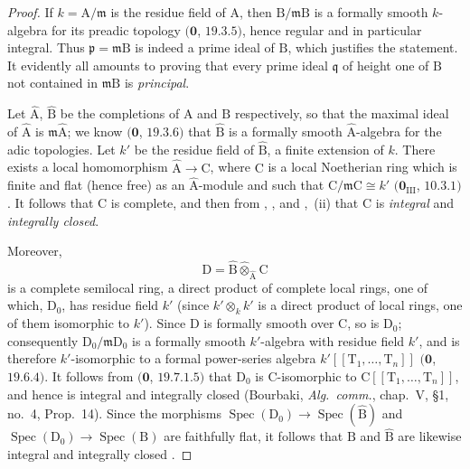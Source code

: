 \begin{proof}
If $k=\mathrm{A}/\mathfrak{m}$ is the residue field of $\mathrm{A}$, then $\mathrm{B}/\mathfrak{m}\mathrm{B}$ is a formally smooth $k$-algebra for its preadic topology $(\mathbf{0}$, $19.3.5)$, hence regular and in particular integral. Thus $\mathfrak{p}=\mathfrak{m}\mathrm{B}$ is indeed a prime ideal of $\mathrm{B}$, which justifies the statement.
It evidently all amounts to proving that every prime ideal $\mathfrak{q}$ of height one of $\mathrm{B}$ not contained in $\mathfrak{m}\mathrm{B}$ is \emph{principal}.

Let $\widehat{\mathrm{A}}$, $\widehat{\mathrm{B}}$ be the completions of $\mathrm{A}$ and $\mathrm{B}$ respectively, so that the maximal ideal of $\widehat{\mathrm{A}}$ is $\mathfrak{m}\widehat{\mathrm{A}}$; we know $(\mathbf{0}$, $19.3.6)$ that $\widehat{\mathrm{B}}$ is a formally smooth $\widehat{\mathrm{A}}$-algebra for the adic topologies.
Let $k'$ be the residue field of $\widehat{\mathrm{B}}$, a finite extension of $k$. There exists a local homomorphism $\widehat{\mathrm{A}}\to\mathrm{C}$, where $\mathrm{C}$ is a local Noetherian ring which is finite and flat (hence free) as an $\widehat{\mathrm{A}}$-module and such that $\mathrm{C}/\mathfrak{m}\mathrm{C}\cong k'$ $(\mathbf{0}_{\mathrm{III}}$, $10.3.1)$. It follows that $\mathrm{C}$ is complete, and then from , , and ,~(ii) that $\mathrm{C}$ is \emph{integral} and \emph{integrally closed}.

Moreover,
\[
  \mathrm{D}=\widehat{\mathrm{B}}\widehat{\otimes}_{\widehat{\mathrm{A}}}\mathrm{C}
\]
is a complete semilocal ring, a direct product of complete local rings, one of which, $\mathrm{D}_0$, has residue field $k'$ (since $k'\otimes_k k'$ is a direct product of local rings, one of them isomorphic to $k'$). Since $\mathrm{D}$ is formally smooth over $\mathrm{C}$, so is $\mathrm{D}_0$; consequently $\mathrm{D}_0/\mathfrak{m}\mathrm{D}_0$ is a formally smooth $k'$-algebra with residue field $k'$, and is therefore $k'$-isomorphic to a formal power-series algebra $k'[[\mathrm{T}_1,\ldots,\mathrm{T}_n]]$ $(\mathbf{0}$, $19.6.4)$. It follows from $(\mathbf{0}$, $19.7.1.5)$ that $\mathrm{D}_0$ is $\mathrm{C}$-isomorphic to $\mathrm{C}[[\mathrm{T}_1,\ldots,\mathrm{T}_n]]$, and hence is integral and integrally closed (Bourbaki, \emph{Alg.\ comm.}, chap.~V, \S1, no.~4, Prop.~14). Since the morphisms $\operatorname{Spec}(\mathrm{D}_0)\to\operatorname{Spec}(\widehat{\mathrm{B}})$ and $\operatorname{Spec}(\mathrm{D}_0)\to\operatorname{Spec}(\mathrm{B})$ are faithfully flat, it follows that $\mathrm{B}$ and $\widehat{\mathrm{B}}$ are likewise integral and integrally closed .


\end{proof}
